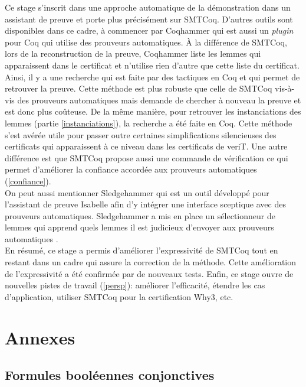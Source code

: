\documentclass[11pt]{article}
\begin{document}
Ce stage s'inscrit dans une approche automatique de la démonstration dans un assistant de preuve et porte plus précisément sur SMTCoq. D'autres outils sont disponibles dans ce cadre, à commencer par Coqhammer \cite{coqhammer} qui est aussi un \textit{plugin} pour Coq qui utilise des prouveurs automatiques. À la différence de SMTCoq, lors de la reconstruction de la preuve, Coqhammer liste les lemmes qui apparaissent dans le certificat et n'utilise rien d'autre que cette liste du certificat. Ainsi, il y a une recherche qui est faite par des tactiques en Coq et qui permet de retrouver la preuve. Cette méthode est plus robuste que celle  de SMTCoq vis-à-vis des prouveurs automatiques mais demande de chercher à nouveau la preuve et est donc plus coûteuse. De la même manière, pour retrouver les instanciations des lemmes (partie \ref{instanciations}), la recherche a été faite en Coq. Cette méthode s'est avérée utile pour passer outre certaines simplifications silencieuses des certificats qui apparaissent à ce niveau dans les certificats de veriT. Une autre différence est que SMTCoq propose aussi une commande de vérification ce qui permet d'améliorer la confiance accordée aux prouveurs automatiques (\ref{confiance}).\\
On peut aussi mentionner Sledgehammer \cite{sledgehammer_manual} qui est un outil développé pour l'assistant de preuve Isabelle afin d'y intégrer une interface sceptique avec des prouveurs automatiques. Sledgehammer a mis en place un sélectionneur de lemmes qui apprend quels lemmes il est judicieux d'envoyer aux prouveurs automatiques \cite{hol_selector}.\\

En résumé, ce stage a permis d'améliorer l'expressivité de SMTCoq tout en restant dans un cadre qui assure la correction de la méthode. Cette amélioration de l'expressivité a été confirmée par de nouveaux tests. Enfin, ce stage ouvre de nouvelles pistes de travail (\ref{persp}): améliorer l'efficacité, étendre les cas d'application, utiliser SMTCoq pour la certification Why3, etc.



\renewcommand\refname{Bibliographie}
\nocite{*}
{}


\newpage
\pagestyle{empty}

\section{Annexes}
\subsection{Formules booléennes conjonctives} \label{annexe_peigne}
\end{document}
